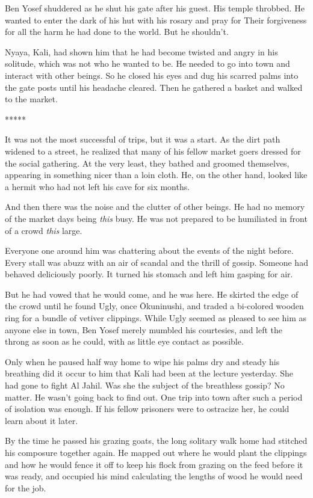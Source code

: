 \documentclass{amsart}
\begin{document}
Ben Yosef shuddered as he shut his gate after his guest. His temple throbbed. He wanted to enter the dark of his hut with his rosary and pray for Their forgiveness for all the harm he had done to the world. But he shouldn't.

Nyaya, Kali, had shown him that he had become twisted and angry in his solitude, which was not who he wanted to be. He needed to go into town and interact with other beings. So he closed his eyes and dug his scarred palms into the gate posts until his headache cleared. Then he gathered a basket and walked to the market. 

\begin{center}*****\end{center}

It was not the most successful of trips, but it was a start. As the dirt path widened to a street, he realized that many of his fellow market goers dressed for the social gathering. At the very least, they bathed and groomed themselves, appearing in something nicer than a loin cloth. He, on the other hand, looked like a hermit who had not left his cave for six months. 

And then there was the noise and the clutter of other beings. He had no memory of the market days being \emph{this} busy. He was not prepared to be humiliated in front of a crowd \emph{this} large. 

Everyone one around him was chattering about the events of the night before. Every stall was abuzz with an air of scandal and the thrill of gossip. Someone had behaved deliciously poorly. It turned his stomach and left him gasping for air. 

But he had vowed that he would come, and he was here. He skirted the edge of the crowd until he found Ugly, once Ōkuninushi, and traded a bi-colored wooden ring for a bundle of vetiver clippings. While Ugly seemed as pleased to see him as anyone else in town, Ben Yosef merely mumbled his courtesies, and left the throng as soon as he could, with as little eye contact as possible. 

Only when he paused half way home to wipe his palms dry and steady his breathing did it occur to him that Kali had been at the lecture yesterday. She had gone to fight Al Jahil. Was she the subject of the breathless gossip? No matter. He wasn't going back to find out. One trip into town after such a period of isolation was enough. If his fellow prisoners were to ostracize her, he could learn about it later. 

By the time he passed his grazing goats, the long solitary walk home had stitched his composure together again. He mapped out where he would plant the clippings and how he would fence it off to keep his flock from grazing on the feed before it was ready, and occupied his mind calculating the lengths of wood he would need for the job. 
\end{document}

